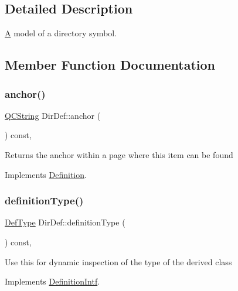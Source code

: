 \subsection{Detailed Description}
\mbox{\hyperlink{class_a}{A}} model of a directory symbol. 

\subsection{Member Function Documentation}
\mbox{\label{class_dir_def_ac28d85c84dbb71901ca49263f65dbdec}} 
\subsubsection{\texorpdfstring{anchor()}{anchor()}}
{\footnotesize\ttfamily \mbox{\hyperlink{class_q_c_string}{Q\+C\+String}} Dir\+Def\+::anchor (\begin{DoxyParamCaption}{ }\end{DoxyParamCaption}) const\hspace{0.3cm}{\ttfamily [inline]}, {\ttfamily [virtual]}}

Returns the anchor within a page where this item can be found 

Implements \mbox{\hyperlink{class_definition_a56e91f9b76f41208a22cfb2336871604}{Definition}}.

\mbox{\label{class_dir_def_abd7bc6eb8fd85af099e2d0cb7ad322db}} 
\subsubsection{\texorpdfstring{definitionType()}{definitionType()}}
{\footnotesize\ttfamily \mbox{\hyperlink{class_definition_intf_ada60114bc621669dd8c19edfc6421766}{Def\+Type}} Dir\+Def\+::definition\+Type (\begin{DoxyParamCaption}{ }\end{DoxyParamCaption}) const\hspace{0.3cm}{\ttfamily [inline]}, {\ttfamily [virtual]}}

Use this for dynamic inspection of the type of the derived class 

Implements \mbox{\hyperlink{class_definition_intf_ac8ee00bc1af5558ae37f6896d16f5a3a}{Definition\+Intf}}.

